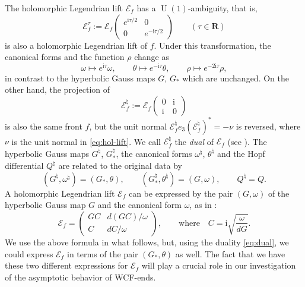 \documentclass[a4paper]{amsart}
\theoremstyle{plain}
\theoremstyle{remark}
\numberwithin{equation}{section}
\begin{document}
The holomorphic Legendrian lift ${\mathcal{E}}_f$ has a ${\operatorname{U}}(1)$-ambiguity,
that is, 
\[
   {\mathcal{E}}_f^{\tau}:={\mathcal{E}}_f
      \begin{pmatrix} 
       e^{{\mathrm{i}}\tau/2} & 0 \\
           0           & e^{-{\mathrm{i}}\tau/2}
      \end{pmatrix}\qquad(\tau\in{\boldsymbol{R}})
\]
is also a holomorphic Legendrian lift of $f$.
Under this transformation, the canonical forms and the function $\rho$
change as
\begin{equation}\label{eq:u-one-amb}
   \omega \mapsto e^{{\mathrm{i}}\tau}\omega,\qquad
   \theta \mapsto e^{-{\mathrm{i}}\tau}\theta,\qquad
   \rho \mapsto e^{-2{\mathrm{i}}\tau}\rho, 
\end{equation}
in contrast to the hyperbolic Gauss maps 
$G$, $G_*$ which are unchanged.
On the other hand, the projection of 
\begin{equation}\label{eq:dual}
   {\mathcal{E}}_f^{\natural} :=
   {\mathcal{E}}_f\begin{pmatrix} 
	0 & {\mathrm{i}} \\ {\mathrm{i}} & 0
       \end{pmatrix}
\end{equation}
is also the same front $f$, but the unit normal
${\mathcal{E}}_f^{\natural}e_3({\mathcal{E}}_f^{\natural})^*=-\nu$ is reversed, where $\nu$ is
the unit normal in \eqref{eq:hol-lift}.
We call ${\mathcal{E}}_f^{\natural}$ the {\em dual\/} of ${\mathcal{E}}_f$ 
(see \cite[Remark 2.1]{KRUY}).
The hyperbolic Gauss maps $G^{\natural}$, $G^{\natural}_*$, the
canonical forms $\omega^{\natural}$, $\theta^{\natural}$
and the Hopf differential $Q^{\natural}$ are related to the original data
by 
\begin{equation*}
 (G^{\natural},\omega^{\natural})  = (G_*,\theta),\qquad
 (G^{\natural}_*,\theta^{\natural})  = (G,\omega),\qquad
 Q^{\natural}= Q.
\end{equation*}
A holomorphic Legendrian lift ${\mathcal{E}}_f$ can be expressed by 
the pair $(G,\omega)$ of the hyperbolic
Gauss map $G$ and the canonical form $\omega$, as in \cite{KUY1}:
\begin{equation}\label{eq:g-omega-repr}
  {\mathcal{E}}_f = \begin{pmatrix}
	    GC & d(GC)/\omega \\
	     C & dC/\omega
	 \end{pmatrix},\qquad\text{where}\quad
	 C = {\mathrm{i}} \sqrt{\frac{\omega}{dG}}.
\end{equation}
We use the above formula in what follows, but, 
using the duality \eqref{eq:dual}, we could express ${\mathcal{E}}_f$
in terms of the pair $(G_*,\theta)$ as well.  
The fact that we have these two different expressions for 
${\mathcal{E}}_f$ will play a crucial role in our 
investigation of the asymptotic behavior of WCF-ends.
\end{document}
